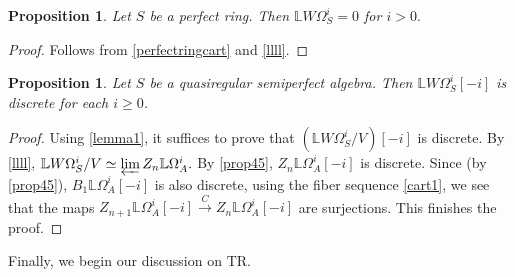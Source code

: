 \documentclass[10pt,letterpaper]{amsart}
\numberwithin{figure}{section}
\numberwithin{equation}{section}
\newtheorem{proposition}[figure]{Proposition}
\theoremstyle{definition}
\theoremstyle{definition}
\newtheorem{remark}[figure]{Remark}
\theoremstyle{definition}
\theoremstyle{definition}
\newcommand{\LL}{\L}
\newcommand{\TR}{\mathrm{TR}}
\renewcommand{\L}{\mathbb{L}}
\begin{document}
\begin{proposition}\label{perfectwitt}
Let $S$ be a perfect ring. Then $\LL W \Omega^i_S = 0$ for $i>0.$    
\end{proposition}{}
\begin{proof}
Follows from \cref{perfectringcart} and \cref{llll}.     
\end{proof}{}

    


\begin{proposition}\label{fixthis}
    Let $S$ be a quasiregular semiperfect algebra. Then $\L W\Omega^i_S[-i]$ is discrete for each $i \ge 0$.
\end{proposition}{}

\begin{proof}
Using \cref{lemma1}, it suffices to prove that $(\L W \Omega^i_S/V) [-i]$ is discrete. By \cref{llll}, $\L W \Omega^i_S/V \simeq \varprojlim  Z_n \LL \Omega^i_A.$ By \cref{prop45}, $ Z_n \LL \Omega^i_A[-i]$ is discrete. Since (by \cref{prop45}), $B_1 \LL \Omega^i_A[-i]$ is also discrete, using the fiber sequence \cref{cart1}, we see that the maps $ Z_{n+1} \LL \Omega^i_A[-i] \xrightarrow{C}  Z_n \LL \Omega^i_A[-i]$ are surjections. This finishes the proof. 
\end{proof}{}



Finally, we begin our discussion on $\TR.$
\end{document}
